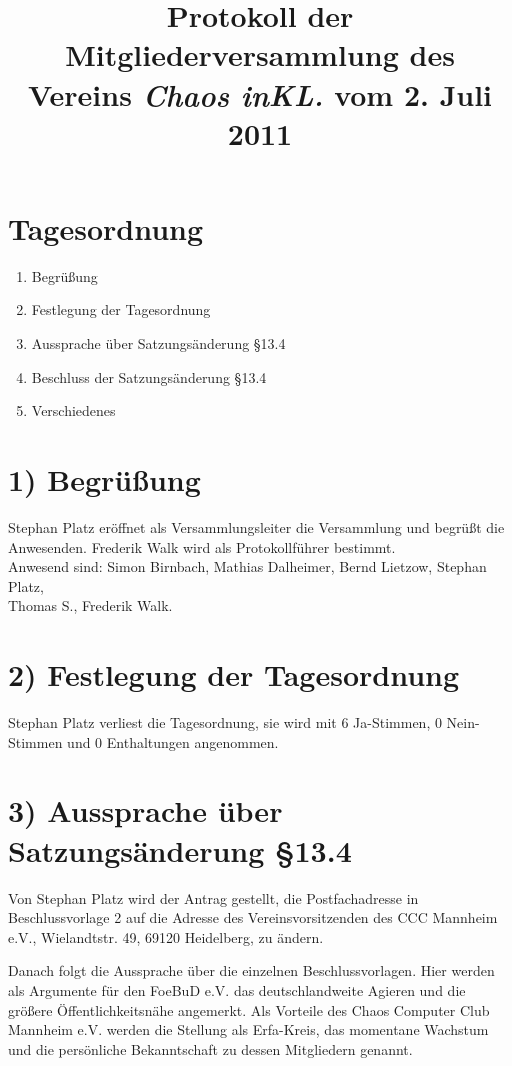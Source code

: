 \documentclass{scrartcl}
\title{Protokoll der Mitgliederversammlung des Vereins \emph{Chaos inKL.} vom 2. Juli 2011}
\begin{document}
 
\maketitle

\section*{Tagesordnung}

\begin{enumerate}
  \setlength{\itemsep}{1pt}
  \item Begrüßung
  \item Festlegung der Tagesordnung
  \item Aussprache über Satzungsänderung \S13.4
  \item Beschluss der Satzungsänderung \S13.4
  \item Verschiedenes
\end{enumerate}

\section*{1) Begrüßung}

    Stephan Platz eröffnet als Versammlungsleiter die Versammlung und begrüßt die Anwesenden.
    Frederik Walk wird als Protokollführer bestimmt.\\
    Anwesend sind: Simon Birnbach, Mathias Dalheimer, Bernd Lietzow, Stephan Platz,\\
    Thomas S., Frederik Walk.

\section*{2) Festlegung der Tagesordnung}
    
    Stephan Platz verliest die Tagesordnung, sie wird mit 6 Ja-Stimmen, 0 Nein-Stimmen und 0 Enthaltungen angenommen.

\section*{3) Aussprache über Satzungsänderung \S13.4}

    Von Stephan Platz wird der Antrag gestellt, die Postfachadresse in Beschlussvorlage 2 auf die Adresse des Vereinsvorsitzenden des CCC Mannheim e.V., Wielandtstr. 49, 69120 Heidelberg, zu ändern.

    Danach folgt die Aussprache über die einzelnen Beschlussvorlagen. Hier werden als Argumente für den FoeBuD e.V. das deutschlandweite Agieren und die größere Öffentlichkeitsnähe angemerkt. Als Vorteile des Chaos Computer Club Mannheim e.V. werden die Stellung als Erfa-Kreis, das momentane Wachstum und die persönliche Bekanntschaft zu dessen Mitgliedern genannt.
    
\end{document}
